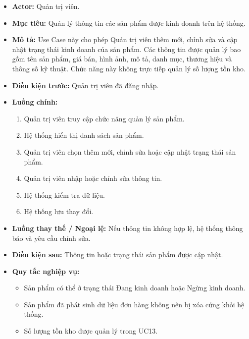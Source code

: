 \documentclass[12pt,a4paper]{article}
\begin{document}
\begin{itemize}

    \item \textbf{Actor:} Quản trị viên.

    \item \textbf{Mục tiêu:} Quản lý thông tin các sản phẩm được kinh doanh trên hệ thống.

    \item \textbf{Mô tả:} Use Case này cho phép Quản trị viên thêm mới, chỉnh sửa và cập nhật trạng thái kinh doanh của sản phẩm. Các thông tin được quản lý bao gồm tên sản phẩm, giá bán, hình ảnh, mô tả, danh mục, thương hiệu và thông số kỹ thuật. Chức năng này không trực tiếp quản lý số lượng tồn kho.

    \item \textbf{Điều kiện trước:} Quản trị viên đã đăng nhập.

    \item \textbf{Luồng chính:}
    \begin{enumerate}
        \item Quản trị viên truy cập chức năng quản lý sản phẩm.
        \item Hệ thống hiển thị danh sách sản phẩm.
        \item Quản trị viên chọn thêm mới, chỉnh sửa hoặc cập nhật trạng thái sản phẩm.
        \item Quản trị viên nhập hoặc chỉnh sửa thông tin.
        \item Hệ thống kiểm tra dữ liệu.
        \item Hệ thống lưu thay đổi.
    \end{enumerate}

    \item \textbf{Luồng thay thế / Ngoại lệ:} Nếu thông tin không hợp lệ, hệ thống thông báo và yêu cầu chỉnh sửa.

    \item \textbf{Điều kiện sau:} Thông tin hoặc trạng thái sản phẩm được cập nhật.

    \item \textbf{Quy tắc nghiệp vụ:}
    \begin{itemize}
        \item Sản phẩm có thể ở trạng thái Đang kinh doanh hoặc Ngừng kinh doanh.
        \item Sản phẩm đã phát sinh dữ liệu đơn hàng không nên bị xóa cứng khỏi hệ thống.
        \item Số lượng tồn kho được quản lý trong UC13.
    \end{itemize}

\end{itemize}
\end{document}
